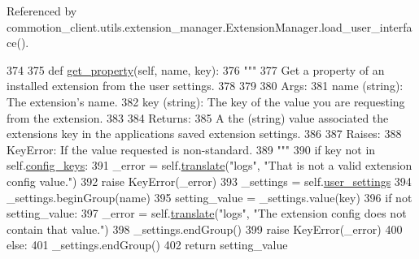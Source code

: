 Referenced by commotion\+\_\+client.\+utils.\+extension\+\_\+manager.\+Extension\+Manager.\+load\+\_\+user\+\_\+interface().


\begin{DoxyCode}
374 
375     \textcolor{keyword}{def }\hyperlink{classcommotion__client_1_1utils_1_1extension__manager_1_1ExtensionManager_a91552f94535d729789bcb7da471d90fe}{get\_property}(self, name, key):
376         \textcolor{stringliteral}{"""}
377 \textcolor{stringliteral}{        Get a property of an installed extension from the user settings.}
378 \textcolor{stringliteral}{}
379 \textcolor{stringliteral}{        }
380 \textcolor{stringliteral}{        Args:}
381 \textcolor{stringliteral}{          name (string): The extension's name.}
382 \textcolor{stringliteral}{          key (string): The key of the value you are requesting from the extension.}
383 \textcolor{stringliteral}{}
384 \textcolor{stringliteral}{        Returns:}
385 \textcolor{stringliteral}{          A the (string) value associated the extensions key in the applications saved extension settings.}
386 \textcolor{stringliteral}{        }
387 \textcolor{stringliteral}{        Raises:}
388 \textcolor{stringliteral}{          KeyError: If the value requested is non-standard.}
389 \textcolor{stringliteral}{        """}
390         \textcolor{keywordflow}{if} key \textcolor{keywordflow}{not} \textcolor{keywordflow}{in} self.\hyperlink{classcommotion__client_1_1utils_1_1extension__manager_1_1ExtensionManager_a72f3a3497a4593880a56e3952e674b13}{config\_keys}:
391             \_error = self.\hyperlink{classcommotion__client_1_1utils_1_1extension__manager_1_1ExtensionManager_a2cfd032ca383c3fd6f0f52b99b6dd67c}{translate}(\textcolor{stringliteral}{"logs"}, \textcolor{stringliteral}{"That is not a valid extension config value."})
392             \textcolor{keywordflow}{raise} KeyError(\_error)
393         \_settings = self.\hyperlink{classcommotion__client_1_1utils_1_1extension__manager_1_1ExtensionManager_a0fa8b2be1171ded73629a01c50472d34}{user\_settings}
394         \_settings.beginGroup(name)
395         setting\_value = \_settings.value(key)
396         \textcolor{keywordflow}{if} \textcolor{keywordflow}{not} setting\_value:
397             \_error = self.\hyperlink{classcommotion__client_1_1utils_1_1extension__manager_1_1ExtensionManager_a2cfd032ca383c3fd6f0f52b99b6dd67c}{translate}(\textcolor{stringliteral}{"logs"}, \textcolor{stringliteral}{"The extension config does not contain that value."})
398             \_settings.endGroup()
399             \textcolor{keywordflow}{raise} KeyError(\_error)
400         \textcolor{keywordflow}{else}:
401             \_settings.endGroup()
402             \textcolor{keywordflow}{return} setting\_value

\end{DoxyCode}
